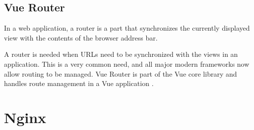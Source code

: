 \subsection{Vue Router }
\label{sec:Vue Router}

In a web application, a router is a part that synchronizes the currently displayed view with the contents of the browser address bar.

A router is needed when \gls{URL}s need to be synchronized with the views in an application. This is a very common need, and all major modern frameworks now allow routing to be managed.   Vue Router is part of the Vue core library and handles route management in a Vue application \cite{VueGuide:Online}.


	\section{Nginx}
	\label{Grundlagen:Nginx}


		
